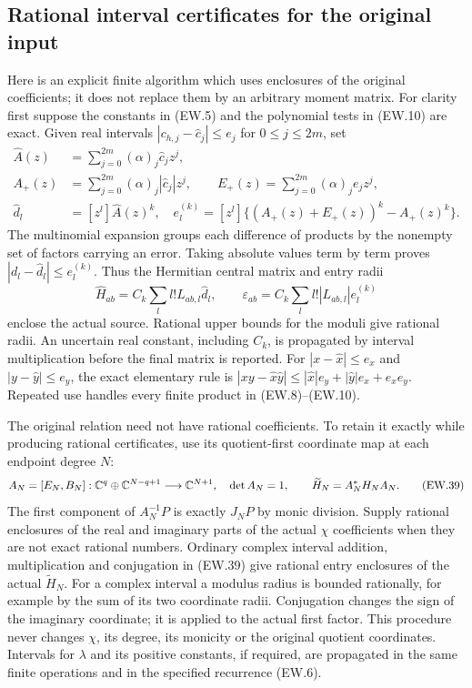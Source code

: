 \subsection{Rational interval certificates for the original input}

Here is an explicit finite algorithm which uses enclosures of the
original coefficients; it does not replace them by an arbitrary moment
matrix. For clarity first suppose the constants in (EW.5) and the
polynomial tests in (EW.10) are exact. Given real intervals
$|c_{h,j}-\widehat c_j|\le e_j$ for $0\le j\le2m$, set
\[
 \begin{split}
 \widehat A(z)&=\sum_{j=0}^{2m}(\alpha)_j\widehat c_jz^j,\\
 A_+(z)&=\sum_{j=0}^{2m}(\alpha)_j|\widehat c_j|z^j,
 \qquad E_+(z)=\sum_{j=0}^{2m}(\alpha)_je_jz^j,\\
 \widehat d_l&=[z^l]\widehat A(z)^k,\quad
 e_l^{(k)}=[z^l]\{(A_+(z)+E_+(z))^k-A_+(z)^k\}.
 \end{split}                                                   \tag{EW.37}
\]
The multinomial expansion groups each difference of products by
the nonempty set of factors carrying an error. Taking absolute values
term by term proves $|d_l-\widehat d_l|\le e_l^{(k)}$.
Thus the Hermitian central matrix and entry radii
\[
 \widehat H_{ab}=C_k\sum_l l!L_{ab,l}\widehat d_l,\qquad
 \varepsilon_{ab}=C_k\sum_l l!|L_{ab,l}|e_l^{(k)}            \tag{EW.38}
\]
enclose the actual source. Rational upper bounds for the moduli give
rational radii. An uncertain real constant, including $C_k$, is
propagated by interval multiplication before the final matrix is
reported. For $|x-\widehat x|\le e_x$ and
$|y-\widehat y|\le e_y$, the exact elementary rule is
$|xy-\widehat x\widehat y|\le|\widehat x|e_y+
|\widehat y|e_x+e_xe_y$. Repeated use handles every finite
product in (EW.8)--(EW.10).

The original relation need not have rational coefficients. To retain
it exactly while producing rational certificates, use its quotient-first
coordinate map at each endpoint degree $N$:
\[
 A_N=[E_N,B_N]:\mathbb{C}^q\oplus\mathbb{C}^{N-q+1}\longrightarrow\mathbb{C}^{N+1},
 \quad\det A_N=1,\qquad\widetilde H_N=A_N^*H_NA_N.
                                                               \tag{EW.39}
\]
The first component of $A_N^{-1}P$ is exactly $J_NP$ by monic
division. Supply rational enclosures of the real and imaginary parts
of the actual $\chi$ coefficients when they are not exact rational
numbers. Ordinary complex interval addition, multiplication and
conjugation in (EW.39) give rational entry enclosures of the actual
$\widetilde H_N$. For a complex interval a modulus radius is
bounded rationally, for example by the sum of its two coordinate
radii. Conjugation changes the sign of the imaginary coordinate;
it is applied to the actual first factor. This procedure never
changes $\chi$, its degree, its monicity or the original quotient
coordinates. Intervals for $\lambda$ and its positive constants,
if required, are propagated in the same finite operations and in the
specified recurrence (EW.6).

